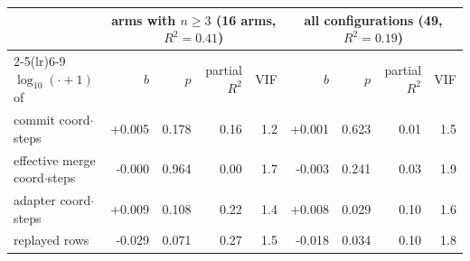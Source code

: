 \begin{tabular}{@{}l r r r r r r r r@{}}
\toprule
 & \multicolumn{4}{c}{arms with $n\ge3$ (16 arms, $R^2=0.41$)} & \multicolumn{4}{c}{all configurations (49, $R^2=0.19$)} \\
\cmidrule(lr){2-5}\cmidrule(lr){6-9}
$\log_{10}(\cdot+1)$ of & $b$ & $p$ & partial $R^2$ & VIF & $b$ & $p$ & partial $R^2$ & VIF \\
\midrule
commit coord$\cdot$steps & +0.005 & 0.178 & 0.16 & 1.2 & +0.001 & 0.623 & 0.01 & 1.5 \\
effective merge coord$\cdot$steps & -0.000 & 0.964 & 0.00 & 1.7 & -0.003 & 0.241 & 0.03 & 1.9 \\
adapter coord$\cdot$steps & +0.009 & 0.108 & 0.22 & 1.4 & +0.008 & 0.029 & 0.10 & 1.6 \\
replayed rows & -0.029 & 0.071 & 0.27 & 1.5 & -0.018 & 0.034 & 0.10 & 1.8 \\
\bottomrule
\end{tabular}
